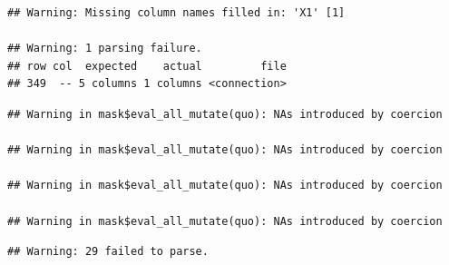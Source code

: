 \documentclass[
]{book}
\newenvironment{Shaded}{\begin{snugshade}}{\end{snugshade}}
\newcommand{\AttributeTok}[1]{\textcolor[rgb]{0.77,0.63,0.00}{#1}}
\newcommand{\DecValTok}[1]{\textcolor[rgb]{0.00,0.00,0.81}{#1}}
\newcommand{\FunctionTok}[1]{\textcolor[rgb]{0.00,0.00,0.00}{#1}}
\newcommand{\NormalTok}[1]{#1}
\newcommand{\OtherTok}[1]{\textcolor[rgb]{0.56,0.35,0.01}{#1}}
\newcommand{\SpecialCharTok}[1]{\textcolor[rgb]{0.00,0.00,0.00}{#1}}
\newcommand{\StringTok}[1]{\textcolor[rgb]{0.31,0.60,0.02}{#1}}
\begin{document}
\begin{Shaded}
\end{Shaded}

\begin{verbatim}
## Warning: Missing column names filled in: 'X1' [1]

## Warning: 1 parsing failure.
## row col  expected    actual         file
## 349  -- 5 columns 1 columns <connection>
\end{verbatim}

\begin{verbatim}
## Warning in mask$eval_all_mutate(quo): NAs introduced by coercion

## Warning in mask$eval_all_mutate(quo): NAs introduced by coercion

## Warning in mask$eval_all_mutate(quo): NAs introduced by coercion

## Warning in mask$eval_all_mutate(quo): NAs introduced by coercion
\end{verbatim}

\begin{verbatim}
## Warning: 29 failed to parse.
\end{verbatim}
\end{document}
